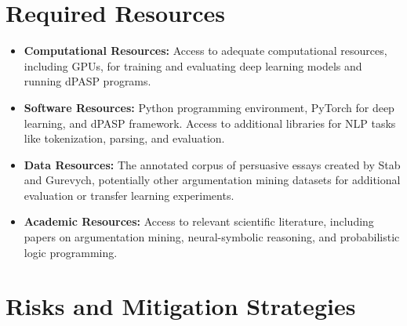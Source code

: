 \documentclass{article}
\begin{document}
\section{Required Resources}

\begin{itemize}
    \item \textbf{Computational Resources:} Access to adequate computational
    resources, including GPUs, for training and evaluating deep learning models
    and running dPASP programs.

    \item \textbf{Software Resources:} Python programming environment, PyTorch
    for deep learning, and dPASP framework. Access to additional libraries for
    NLP tasks like tokenization, parsing, and evaluation.

    \item \textbf{Data Resources:} The annotated corpus of persuasive essays
    created by Stab and Gurevych, potentially other argumentation mining
    datasets for additional evaluation or transfer learning experiments.

    \item \textbf{Academic Resources:} Access to relevant scientific literature,
    including papers on argumentation mining, neural-symbolic reasoning, and
    probabilistic logic programming.
\end{itemize}

\section{Risks and Mitigation Strategies}
\end{document}
